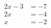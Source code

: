 \documentclass[preview]{standalone}
\begin{document}
\begin{align*}
2x - 3 & = -7 \\ 2x & = -4 \\ x & = -2
\end{align*}
\end{document}
